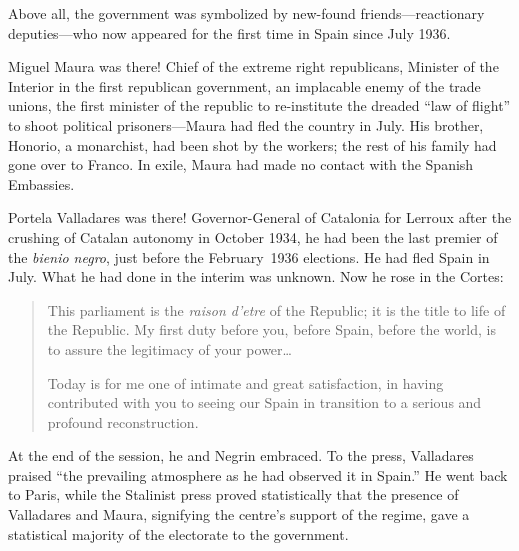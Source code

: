 Above all, the government was symbolized by new-found friends---reactionary deputies---who now appeared for the first time in Spain since July 1936.

Miguel Maura was there! Chief of the extreme right republicans, Minister of the Interior in the first republican government, an implacable enemy of the trade unions, the first minister of the republic to re-institute the dreaded ``law of flight'' to shoot political prisoners---Maura had fled the country in July. His brother, Honorio, a monarchist, had been shot by the workers; the rest of his family had gone over to Franco. In exile, Maura had made no contact with the Spanish Embassies.

Portela Valladares was there! Governor-General of Catalonia for Lerroux after the crushing of Catalan autonomy in October 1934, he had been the last premier of the \emph{bienio negro}, just before the February~1936 elections. He had fled Spain in July. What he had done in the interim was unknown. Now he rose in the Cortes:

\begin{quotation}
  This parliament is the \emph{raison d’etre} of the Republic; it is the title to life of the Republic. My first duty before you, before Spain, before the world, is to assure the legitimacy of your power\dots
  
  Today is for me one of intimate and great satisfaction, in having contributed with you to seeing our Spain in transition to a serious and profound reconstruction.
\end{quotation}

At the end of the session, he and Negrin embraced. To the press, Valladares praised ``the prevailing atmosphere as he had observed it in Spain.'' He went back to Paris, while the Stalinist press proved statistically that the presence of Valladares and Maura, signifying the centre’s support of the regime, gave a statistical majority of the electorate to the government.

